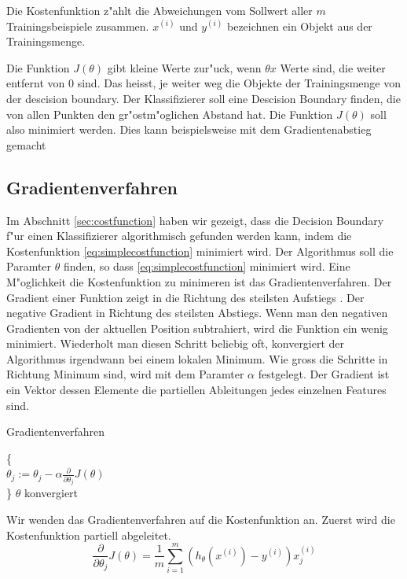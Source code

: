 \documentclass[12pt,a4paper,twoside]{article}
\begin{document}
Die Kostenfunktion z"ahlt die Abweichungen vom Sollwert aller $m$ Trainingsbeispiele zusammen. $x^{(i)}$ und $y^{(i)}$ bezeichnen ein Objekt aus der Trainingsmenge.

Die Funktion $J(\theta)$ gibt kleine Werte zur"uck, wenn $\theta x$ Werte sind, die weiter entfernt von 0 sind. Das heisst, je weiter weg die Objekte der Trainingsmenge von der descision boundary. Der Klassifizierer soll eine Descision Boundary finden, die von allen Punkten den gr"ostm"oglichen Abstand hat. Die Funktion $J(\theta)$ soll also minimiert werden. Dies kann beispielsweise mit dem Gradientenabstieg gemacht 

\subsection{Gradientenverfahren}
\label{sec:gradientdescent}

Im Abschnitt \ref{sec:costfunction} haben wir gezeigt, dass die Decision Boundary f"ur einen Klassifizierer algorithmisch gefunden werden kann, indem die Kostenfunktion \ref{eq:simplecostfunction} minimiert wird. Der Algorithmus soll die Paramter $\theta$ finden, so dass \ref{eq:simplecostfunction} minimiert wird. Eine M"oglichkeit die Kostenfunktion zu minimeren ist das Gradientenverfahren. Der Gradient einer Funktion zeigt in die Richtung des steilsten Aufstiegs \cite{teschl07}. Der negative Gradient in Richtung des steilsten Abstiegs. Wenn man den negativen Gradienten von der aktuellen Position subtrahiert, wird die Funktion ein wenig minimiert. Wiederholt man diesen Schritt beliebig oft, konvergiert der Algorithmus irgendwann bei einem lokalen Minimum. Wie gross die Schritte in Richtung Minimum sind, wird mit dem Paramter $\alpha$ festgelegt. Der Gradient ist ein Vektor dessen Elemente die partiellen Ableitungen jedes einzelnen Features sind.

\begin{algorithm}
\caption{Gradientenverfahren}
\begin{algorithmic}

\Repeat \{ \\
$\theta_j := \theta_j - \alpha \frac{\partial}{\partial \theta_j} J(\theta)$  \\
\}
\Until $\theta$ konvergiert 

 \end{algorithmic}  
\end{algorithm}

Wir wenden das Gradientenverfahren auf die Kostenfunktion an. Zuerst wird die Kostenfunktion partiell abgeleitet.
\begin{equation}
  \label{eq:costderivativ}
  \frac{\partial}{\partial \theta_j} J(\theta) = \frac{1}{m} \sum_{i=1}^m (h_{\theta} (x^{(i)}) - y^{(i)})x_j^{(i)}
\end{equation}
\end{document}
